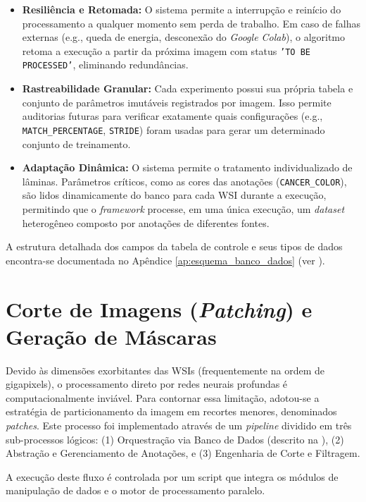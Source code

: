 \begin{itemize}
    \item \textbf{Resiliência e Retomada:} O sistema permite a interrupção e reinício do processamento a qualquer momento sem perda de trabalho. Em caso de falhas externas (e.g., queda de energia, desconexão do \textit{Google Colab}), o algoritmo retoma a execução a partir da próxima imagem com status \texttt{'TO BE PROCESSED'}, eliminando redundâncias.
    \item \textbf{Rastreabilidade Granular:} Cada experimento possui sua própria tabela e conjunto de parâmetros imutáveis registrados por imagem. Isso permite auditorias futuras para verificar exatamente quais configurações (e.g., \texttt{MATCH\_PERCENTAGE}, \texttt{STRIDE}) foram usadas para gerar um determinado conjunto de treinamento.
    \item \textbf{Adaptação Dinâmica:} O sistema permite o tratamento individualizado de lâminas. Parâmetros críticos, como as cores das anotações (\texttt{CANCER\_COLOR}), são lidos dinamicamente do banco para cada WSI durante a execução, permitindo que o \textit{framework} processe, em uma única execução, um \textit{dataset} heterogêneo composto por anotações de diferentes fontes.
\end{itemize}

A estrutura detalhada dos campos da tabela de controle e seus tipos de dados encontra-se documentada no Apêndice \ref{ap:esquema_banco_dados} (ver ).

\section{Corte de Imagens (\textit{Patching}) e Geração de Máscaras}\label{sec:met_corte_imagens}

Devido às dimensões exorbitantes das WSIs (frequentemente na ordem de gigapixels), o processamento direto por redes neurais profundas é computacionalmente inviável. Para contornar essa limitação, adotou-se a estratégia de particionamento da imagem em recortes menores, denominados \textit{patches}. Este processo foi implementado através de um \textit{pipeline} dividido em três sub-processos lógicos: (1) Orquestração via Banco de Dados (descrito na ), (2) Abstração e Gerenciamento de Anotações, e (3) Engenharia de Corte e Filtragem.

A execução deste fluxo é controlada por um script que integra os módulos de manipulação de dados e o motor de processamento paralelo.


